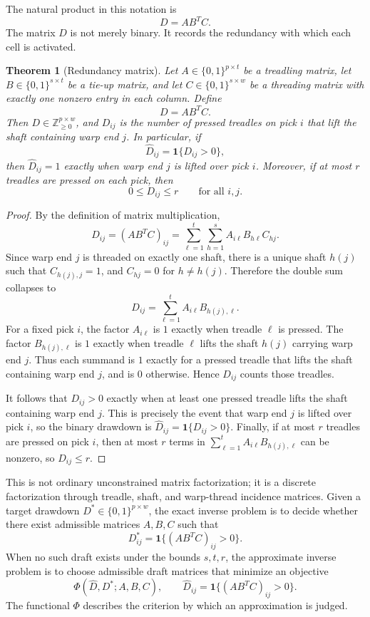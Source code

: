 \documentclass[11pt]{article}
\newtheorem{theorem}{Theorem}
\begin{document}
The natural product in this notation is
\[
  D = A B^{T} C.
\]
The matrix \(D\) is not merely binary. It records the redundancy with which each
cell is activated.

\begin{theorem}[Redundancy matrix]
Let \(A\in\{0,1\}^{p\times t}\) be a treadling matrix, let
\(B\in\{0,1\}^{s\times t}\) be a tie-up matrix, and let
\(C\in\{0,1\}^{s\times w}\) be a threading matrix with exactly one nonzero entry
in each column. Define
\[
  D = A B^{T} C.
\]
Then \(D\in\mathbb{Z}_{\ge 0}^{p\times w}\), and \(D_{ij}\) is the number of
pressed treadles on pick \(i\) that lift the shaft containing warp end \(j\).
In particular, if
\[
  \widehat{D}_{ij}=\mathbf{1}\{D_{ij}>0\},
\]
then \(\widehat{D}_{ij}=1\) exactly when warp end \(j\) is lifted over pick
\(i\). Moreover, if at most \(r\) treadles are pressed on each pick, then
\[
  0 \le D_{ij} \le r
  \qquad
  \text{for all } i,j.
\]
\end{theorem}

\begin{proof}
By the definition of matrix multiplication,
\[
  D_{ij}
  =
  (AB^{T}C)_{ij}
  =
  \sum_{\ell=1}^{t}\sum_{h=1}^{s} A_{i\ell}B_{h\ell}C_{hj}.
\]
Since warp end \(j\) is threaded on exactly one shaft, there is a unique shaft
\(h(j)\) such that \(C_{h(j),j}=1\), and \(C_{hj}=0\) for \(h\ne h(j)\).
Therefore the double sum collapses to
\[
  D_{ij}
  =
  \sum_{\ell=1}^{t} A_{i\ell}B_{h(j),\ell}.
\]
For a fixed pick \(i\), the factor \(A_{i\ell}\) is \(1\) exactly when treadle
\(\ell\) is pressed. The factor \(B_{h(j),\ell}\) is \(1\) exactly when treadle
\(\ell\) lifts the shaft \(h(j)\) carrying warp end \(j\). Thus each summand is \(1\)
exactly for a pressed treadle that lifts the shaft containing warp end \(j\), and
is \(0\) otherwise. Hence \(D_{ij}\) counts those treadles.

It follows that \(D_{ij}>0\) exactly when at least one pressed treadle lifts the
shaft containing warp end \(j\). This is precisely the event that warp end \(j\)
is lifted over pick \(i\), so the binary drawdown is
\(\widehat{D}_{ij}=\mathbf{1}\{D_{ij}>0\}\). Finally, if at most \(r\) treadles
are pressed on pick \(i\), then at most \(r\) terms in
\(\sum_{\ell=1}^{t} A_{i\ell}B_{h(j),\ell}\) can be nonzero, so \(D_{ij}\le r\).
\end{proof}

This is not ordinary unconstrained matrix factorization; it is a discrete
factorization through treadle, shaft, and warp-thread incidence matrices. Given
a target drawdown \(D^\ast\in\{0,1\}^{p\times w}\), the exact inverse problem is
to decide whether there exist admissible matrices \(A,B,C\) such that
\[
  D^\ast_{ij}=\mathbf{1}\{(AB^TC)_{ij}>0\}.
\]
When no such draft exists under the bounds \(s,t,r\), the approximate inverse
problem is to choose admissible draft matrices that minimize an objective
\[
  \Phi(\widehat{D},D^\ast;A,B,C),
  \qquad
  \widehat{D}_{ij}=\mathbf{1}\{(AB^T C)_{ij}>0\}.
\]
The functional \(\Phi\) describes the criterion by which an approximation is
judged.
\end{document}
